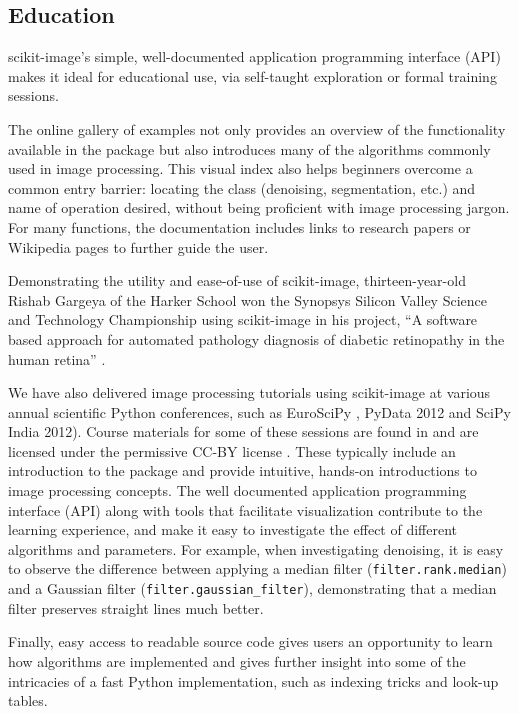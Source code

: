 
  \subsection*{Education}
    \label{education}

    scikit-image's simple, well-documented application programming interface (API) makes it ideal for educational use, via self-taught exploration or formal training sessions.

    The online gallery of examples not only provides an overview of the functionality available in the package but also introduces many of the algorithms commonly used in image processing. This visual index also helps beginners overcome a common entry barrier: locating the class (denoising, segmentation, etc.) and name of operation desired, without being proficient with image processing jargon.  For many functions, the documentation includes links to research papers or Wikipedia pages to further guide the user.

    Demonstrating the utility and ease-of-use of scikit-image, thirteen-year-old Rishab Gargeya of the Harker School won the Synopsys Silicon Valley Science and Technology Championship using scikit-image in his project, ``A software based approach for automated pathology diagnosis of diabetic retinopathy in the human retina'' \citep{sciencefair}.

    We have also delivered image processing tutorials using scikit-image at various annual scientific Python conferences, such as EuroSciPy \citep{euroscipy2013}, PyData 2012 \citep{pydata2012} and SciPy India 2012). Course materials for some of these sessions are found in \citep{scipylecturenotes} and are licensed under the permissive CC-BY license \citep{cc-by}. These typically include an introduction to the package and provide intuitive, hands-on introductions to image processing concepts. The well documented application programming interface (API) along with tools that facilitate visualization contribute to the learning experience, and make it easy to investigate the effect of different algorithms and parameters. For example, when investigating denoising, it is easy to observe the difference between applying a median filter (\texttt{filter.rank.median}) and a Gaussian filter (\texttt{filter.gaussian\_filter}), demonstrating that a median filter preserves straight lines much better.

    Finally, easy access to readable source code gives users an opportunity to learn how algorithms are implemented and gives further insight into some of the intricacies of a fast Python implementation, such as indexing tricks and look-up tables.
